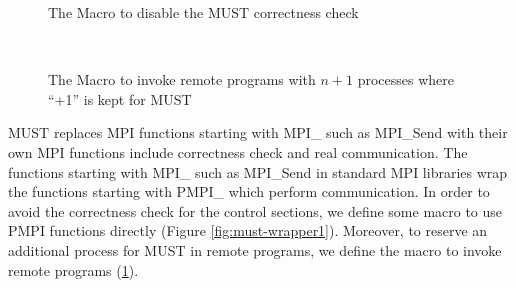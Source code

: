 \documentclass[graybox]{svmult}
\begin{document}
\begin{figure}[t]
\begin{center}
\caption{The Macro to disable the MUST correctness check}
\label{fig:must-wrapper1}
~\\
\caption{The Macro to invoke remote programs with $n+1$ processes where ``+1'' is kept for MUST}
\label{fig:must-wrapper2}
\end{center}
\end{figure}

MUST replaces MPI functions starting with MPI\_ such as MPI\_Send with their own MPI functions include correctness check and real communication. 
The functions starting with MPI\_ such as MPI\_Send in standard MPI libraries wrap the functions starting with PMPI\_ which perform communication. 
In order to avoid the correctness check for the control sections, we define some macro to use PMPI functions directly (Figure \ref{fig:must-wrapper1}). Moreover, to reserve an additional process for MUST in remote programs, we define the macro to invoke remote programs (\ref{fig:must-wrapper2}). 
\end{document}
